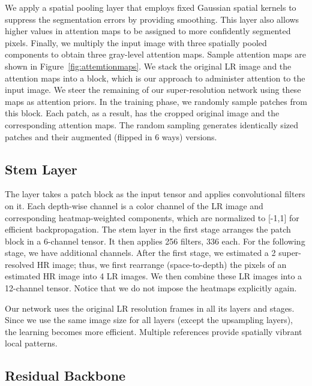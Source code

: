 \documentclass[10pt,twocolumn,letterpaper]{article}
\begin{document}
We apply a spatial pooling layer that employs fixed Gaussian spatial kernels to suppress the segmentation errors by providing smoothing. This layer also allows higher values in attention maps to be assigned to more confidently segmented pixels. Finally, we multiply the input image with three spatially pooled components to obtain three gray-level attention maps. Sample attention maps are shown in Figure~\ref{fig:attemtionmaps}. We stack the original LR image and the attention maps into a block, which is our approach to administer attention to the input image. We steer the remaining of our super-resolution network using these maps as attention priors. In the training phase, we randomly sample patches from this block. Each patch, as a result, has the cropped original image and the corresponding attention maps. The random sampling generates identically sized patches and their augmented (flipped in 6 ways) versions. 

\subsection{Stem Layer}

The layer takes a patch block as the input tensor and applies convolutional filters on it. Each depth-wise channel is a color channel of the LR image and corresponding heatmap-weighted components, which are normalized to [-1,1] for efficient backpropagation. The stem layer in the first stage arranges the patch block in a 6-channel tensor. It then applies 256 filters, 336 each. For the following stage, we have additional channels. After the first stage, we estimated a 2 super-resolved HR image; thus, we first rearrange (space-to-depth) the pixels of an estimated HR image into 4 LR images. We then combine these LR images into a 12-channel tensor. Notice that we do not impose the heatmaps explicitly again.

Our network uses the original LR resolution frames in all its layers and stages. Since we use the same image size for all layers (except the upsampling layers), the learning becomes more efficient. Multiple references provide spatially vibrant local patterns.

\subsection{Residual Backbone}
\end{document}

